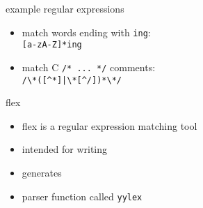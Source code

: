 \begin{frame}[fragile,label=example1]{example regular expressions}
    \begin{itemize}
    \item match words ending with {\tt ing}: \\
        \verb|[a-zA-Z]*ing|
    \item match C {\tt /* ... */} comments: \\
        \verb!/\*([^*]|\*[^/])*\*/!
    \end{itemize}
\end{frame}

\begin{frame}{flex}
    \begin{itemize}
    \item flex is a regular expression matching tool
    \item intended for writing 
    \item generates 
    \item parser function called {\tt yylex}
    \end{itemize}
\end{frame}


